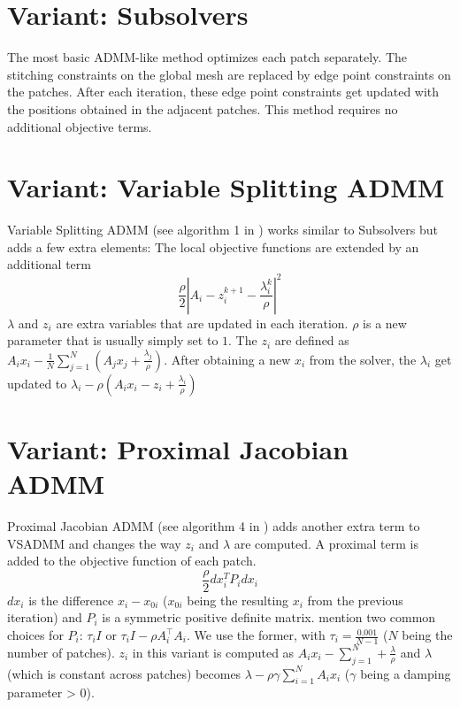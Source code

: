\documentclass[a4paper,twoside,12pt,nochapterprefix]{scrbook}
\begin{document}
\section{Variant: Subsolvers}
The most basic ADMM-like method optimizes each patch separately. The stitching constraints on the global mesh are replaced by edge point constraints on the patches. After each iteration, these edge point constraints get updated with the positions obtained in the adjacent patches. This method requires no additional objective terms.\newline
\section{Variant: Variable Splitting ADMM}
Variable Splitting ADMM (see algorithm 1 in \cite{Deng2017ParallelMA}) works similar to Subsolvers but adds a few extra elements: The local objective functions %
 are extended by an additional term
\begin{equation}
\frac{\rho}{2}|A_i - z^{k+1}_i -\frac{\lambda_i^k}{\rho} |^2 
\end{equation}
$\lambda$ and $z_i$ are extra variables that are updated in each iteration. $\rho$ is a new parameter that is usually simply set to $1$. The $z_i$ are defined as $A_i x_i - \frac{1}{N}\sum_{j=1}^N(A_j x_j + \frac{\lambda_j}{\rho})$. After obtaining a new $x_i$ from the solver, the $\lambda_i$ get updated to $\lambda_i - \rho(A_i x_i - z_i +\frac{\lambda_i}{\rho})$
\section{Variant: Proximal Jacobian ADMM}
Proximal Jacobian ADMM (see algorithm 4 in \cite{Deng2017ParallelMA}) adds another extra term to VSADMM and changes the way $z_i$ and $\lambda$ are computed. A proximal term is added to the objective function of each patch.
\begin{equation}
\frac{\rho}{2} dx_i^T P_i dx_i
\end{equation}
$dx_i$ is the difference $x_i - x_{0i}$ ($x_{0i}$ being the resulting $x_i$ from the previous iteration) and $P_i$ is a symmetric positive definite matrix. \cite{Deng2017ParallelMA} mention two common choices for $P_i$: $\tau_i I$ or $\tau_i I -\rho A_i^\top A_i$. We use the former, with $\tau_i = \frac{0.001}{N-1}$ ($N$ being the number of patches).\newline
$z_i$ in this variant is computed as $A_i x_i - \sum_{j=1}^N + \frac{\lambda}{\rho}$ and $\lambda$ (which is constant across patches) becomes $\lambda - \rho \gamma \sum_{i=1}^N A_i x_i$ ($\gamma$ being a damping parameter > $0$).
\end{document}
